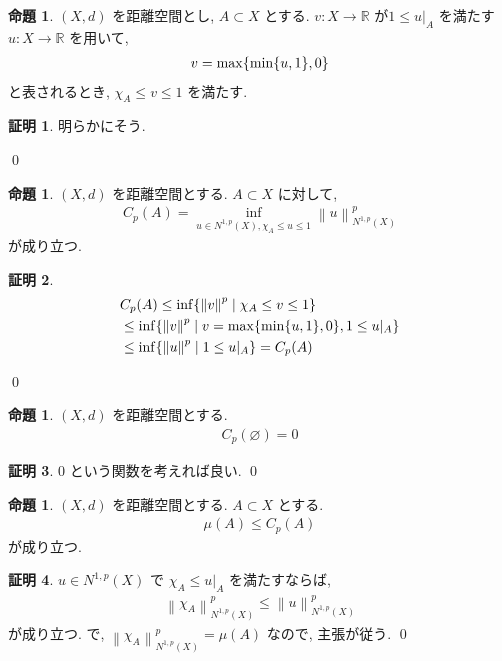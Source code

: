 \documentclass[10pt, fleqn, label-section=none]{bxjsarticle}
\theoremstyle{definition}
\newtheorem{prop}[dfn]{命題}
\newtheorem*{pf*}{証明}
\newcommand{\cbra}[1]{\mleft\{#1\mright\}}
\newcommand{\norm}[1]{\left\|#1\right\|}
\renewcommand{\;}{\, ; \,}
\begin{document}
\begin{prop}$(X, d)$ を距離空間とし, $A \subset X$ とする. $v: X \rightarrow \mathbb R$ が$1 \leq u|_A $ を満たす$u: X \rightarrow \mathbb R$ を用いて, 
\begin{align*} v =  \max \cbra{\min \cbra{u, 1}, 0}  \end{align*}
と表されるとき, $\chi_A \leq v \leq 1$ を満たす. 
\end{prop}
\begin{pf*}明らかにそう. 

\qed
\end{pf*}


\begin{prop}$(X, d)$ を距離空間とする. $A \subset X$ に対して, 
\begin{align*} C_p (A) =  \inf_{u \in N^{1, p}(X),  \chi_A \leq u \leq 1} \norm{u}^p _{N^{1, p}(X)}  \end{align*}
が成り立つ. 
\end{prop}
\begin{pf*}
\begin{align*} &C_p (A) \leq \inf \cbra{ \norm v ^p \mid \chi_A \leq v \leq 1 }  \\& \leq \inf \cbra{ \norm v ^p  \mid {v = \max \cbra{\min \cbra{u, 1}, 0} , 1 \leq u|_A }  } \\& \leq \inf \cbra{ \norm u ^p \mid  1 \leq u|_A  } = C_p (A)     \end{align*}

\qed
\end{pf*}

\begin{prop}$(X, d)$ を距離空間とする. 
\begin{align*} C_p(\varnothing ) = 0\end{align*}
\end{prop}
\begin{pf*}
$0$ という関数を考えれば良い. 
\qed
\end{pf*}

\begin{prop}$(X, d)$ を距離空間とする. $A \subset X$ とする. 
\begin{align*} \mu (A) \leq C_p (A)  \end{align*}
が成り立つ. 
\end{prop}
\begin{pf*}
$u \in N^{1, p}(X)$ で $ \chi_A \leq u|_A $ を満たすならば,  
\begin{align*} \norm{\chi_A }^p _{N^{1, p}(X)}  \leq   \norm{u}^p _{N^{1, p}(X)}  \end{align*}   
が成り立つ. で, $\norm{\chi_A }^p _{N^{1, p}(X)}  = \mu(A)$ なので, 主張が従う. 
\qed
\end{pf*}
\end{document}
